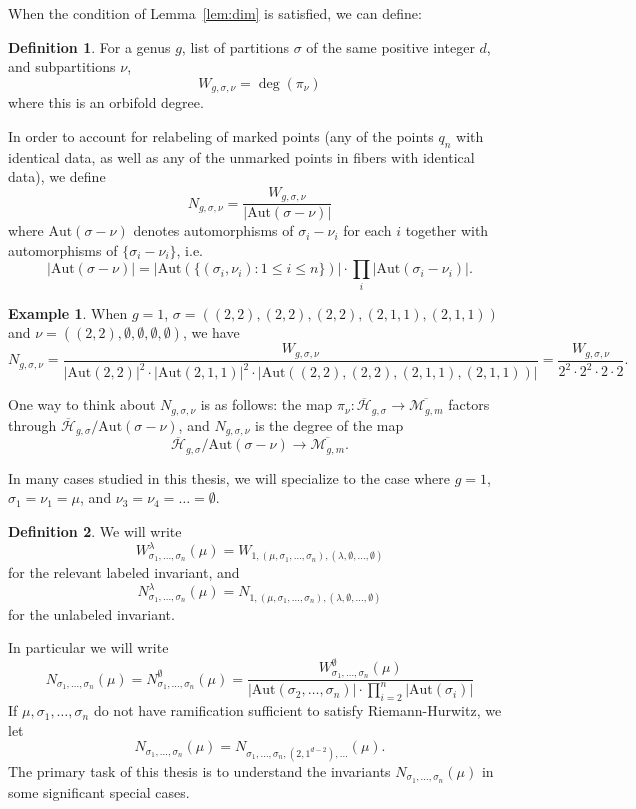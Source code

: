 \documentclass[11pt]{article}           %
\newcommand{\Aut}{\text{Aut}}
\newcommand{\Hb}{\overline{\mathcal H}}
\theoremstyle{definition}
\newtheorem{dfn}{Definition}[section]
\newtheorem{eg}{Example}[section]
\begin{document}
When the condition of Lemma~\ref{lem:dim} is satisfied, we can define:
\begin{dfn}
  For a genus $g$, list of partitions $\sigma$ of the
  same positive integer $d$, and subpartitions $\nu$,
\[
W_{g,\sigma,\nu}=\deg(\pi_{\nu})
\]
where this is an orbifold degree.
\end{dfn}
In order to account for relabeling of marked points (any of the points $q_n$ with identical data, as well as any of the unmarked points in fibers with
identical data), we define
\[
N_{g,\sigma,\nu}=\frac{W_{g,\sigma,\nu}}{|\Aut(\sigma-\nu)|}
\]
where $\Aut(\sigma-\nu)$ denotes automorphisms of $\sigma_i-\nu_i$ for each $i$ together with automorphisms of $\{\sigma_i-\nu_i\}$, i.e.
\[
|\Aut(\sigma-\nu)|=|\Aut(\{(\sigma_i,\nu_i):1\leq i\leq n\})|\cdot \prod_i|\Aut(\sigma_i-\nu_i)|.
\]
\begin{eg}
  When $g=1$, $\sigma=((2,2),(2,2),(2,2),(2,1,1),(2,1,1))$ and $\nu=((2,2),\emptyset,\emptyset,\emptyset,\emptyset)$, we have
  \[
  N_{g,\sigma,\nu}=\frac{W_{g,\sigma,\nu}}{|\Aut(2,2)|^2\cdot |\Aut(2,1,1)|^2\cdot |\Aut((2,2),(2,2),(2,1,1),(2,1,1))|}=\frac{W_{g,\sigma,\nu}}{2^2\cdot 2^2\cdot 2\cdot 2}.
  \]
  \end{eg}

One way to think about $N_{g,\sigma,\nu}$ is as follows: the map
$\pi_{\nu}:\Hb_{g,\sigma}\to\overline{\mathcal M_{g,m}}$ factors through
$\Hb_{g,\sigma}/\Aut(\sigma-\nu)$, and $N_{g,\sigma,\nu}$ is the degree of the map
\[
\Hb_{g,\sigma}/\Aut(\sigma-\nu)\to\overline{\mathcal M_{g,m}}.
\]

In many cases studied in this thesis, we will specialize to the case where $g=1$,
$\sigma_1=\nu_1=\mu$, and $\nu_3=\nu_4=\dots=\emptyset$.
\begin{dfn}
  We will write
\[
W_{\sigma_1,\dots,\sigma_n}^{\lambda}(\mu)=W_{1,(\mu,\sigma_1,\dots,\sigma_n),(\lambda,\emptyset,\dots,\emptyset)}
\]
for the relevant labeled invariant, and
\[
N_{\sigma_1,\dots,\sigma_n}^{\lambda}(\mu)=N_{1,(\mu,\sigma_1,\dots,\sigma_n),(\lambda,\emptyset,\dots,\emptyset)}
\]
for the unlabeled invariant.\end{dfn}
In particular we will write
\[
N_{\sigma_1,\dots,\sigma_n}(\mu)=N_{\sigma_1,\dots,\sigma_n}^{\emptyset}(\mu)=\frac{W_{\sigma_1,\dots,\sigma_n}^{\emptyset}(\mu)}{|\Aut(\sigma_2,\dots,\sigma_n)|\cdot\prod_{i=2}^n|\Aut(\sigma_i)|}
\]
If $\mu,\sigma_1,\dots,\sigma_n$ do not have ramification sufficient to satisfy Riemann-Hurwitz,
we let \[N_{\sigma_1,\dots,\sigma_n}(\mu) = N_{\sigma_1,\dots,\sigma_n,(2,1^{d-2}),\dots}(\mu).\]
The primary task of this thesis is to understand the invariants $N_{\sigma_1,\dots,\sigma_n}(\mu)$
in some significant special cases.
\end{document}
